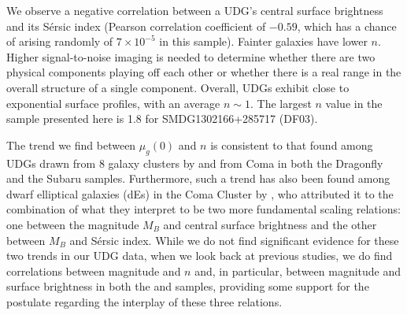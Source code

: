 \documentclass[twocolumn,tighten]{aastex63}
\begin{document}
We observe a negative correlation between a UDG's central surface brightness and its S\'ersic index (Pearson correlation coefficient of $-0.59$, which has a chance of arising randomly of $7 \times 10^{-5}$ in this sample). Fainter galaxies have lower $n$. Higher signal-to-noise imaging is needed to determine whether there are two physical components playing off each other or whether there is a real range in the overall structure of a single component.
Overall, UDGs exhibit close to exponential surface profiles, with an average $n \sim 1$. The largest $n$ value in the sample presented here is 1.8 for  SMDG1302166+285717 (DF03). 

The trend we find between $\mu_g(0)$ and $n$ is consistent to that found among UDGs drawn from 8 galaxy clusters by \cite{Pina2019} and from Coma in both the Dragonfly \citep{vanDokkum2015a} and the Subaru \citep{Yagi2016} samples.
Furthermore, such a trend has also been
found among dwarf elliptical galaxies (dEs) in the Coma Cluster by \cite{Graham03}, 
who attributed it to the combination of what they interpret to be two more fundamental scaling relations: one between the magnitude $M_B$ and central surface brightness and the other between $M_B$ and  S\'ersic index. 
While we do not find significant evidence for these two trends in our UDG data,
when we look back at previous studies, we do find correlations between magnitude and $n$ and, in particular, between magnitude and surface brightness in both the \cite{Yagi2016} and \cite{Pina2019} samples, providing some support for the \cite{Graham03} postulate regarding the interplay of these three relations.  
\end{document}
